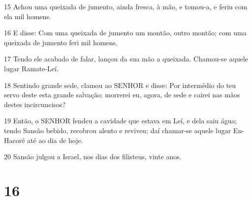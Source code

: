 \par 15 Achou uma queixada de jumento, ainda fresca, à mão, e tomou-a, e feriu com ela mil homens.
\par 16 E disse: Com uma queixada de jumento um montão, outro montão; com uma queixada de jumento feri mil homens.
\par 17 Tendo ele acabado de falar, lançou da sua mão a queixada. Chamou-se aquele lugar Ramate-Leí.
\par 18 Sentindo grande sede, clamou ao SENHOR e disse: Por intermédio do teu servo deste esta grande salvação; morrerei eu, agora, de sede e cairei nas mãos destes incircuncisos?
\par 19 Então, o SENHOR fendeu a cavidade que estava em Leí, e dela saiu água; tendo Sansão bebido, recobrou alento e reviveu; daí chamar-se aquele lugar En-Hacoré até ao dia de hoje.
\par 20 Sansão julgou a Israel, nos dias dos filisteus, vinte anos.

\chapter{16}

